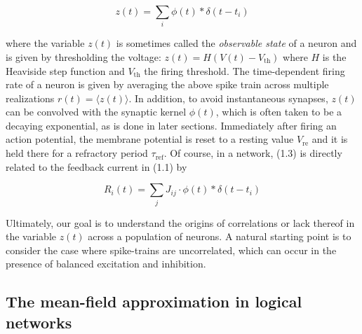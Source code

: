 \documentclass{ucetd}
\begin{document}
\begin{equation}
z(t) = \sum_{i} \phi(t) * \delta(t-t_{i})
\end{equation}

where the variable $z(t)$ is sometimes called the \emph{observable state} of a neuron and is given by thresholding the voltage: $z(t) = H(V(t) - V_{\mathrm{th}})$ where $H$ is the Heaviside step function and $V_{\mathrm{th}}$ the firing threshold. The time-dependent firing rate of a neuron is given by averaging the above spike train across multiple realizations $r(t) = \langle z(t) \rangle$. In addition, to avoid instantaneous synapses, $z(t)$ can be convolved with the synaptic kernel $\phi(t)$, which is often taken to be a decaying exponential, as is done in later sections. Immediately after firing an action potential, the membrane potential is reset to a resting value $V_{\mathrm{re}}$ and it is held there for a refractory period $\tau_{\mathrm{ref}}$. Of course, in a network, (1.3) is directly related to the feedback current in (1.1) by 

\begin{equation}
R_{i}(t) = \sum_{j} J_{ij}\cdot \phi(t) * \delta(t-t_{i})
\end{equation}

Ultimately, our goal is to understand the origins of correlations or lack thereof in the variable $z(t)$ across a population of neurons. A natural starting point is to consider the case where spike-trains are uncorrelated, which can occur in the presence of balanced excitation and inhibition.

\subsection{The mean-field approximation in logical networks}
\end{document}
